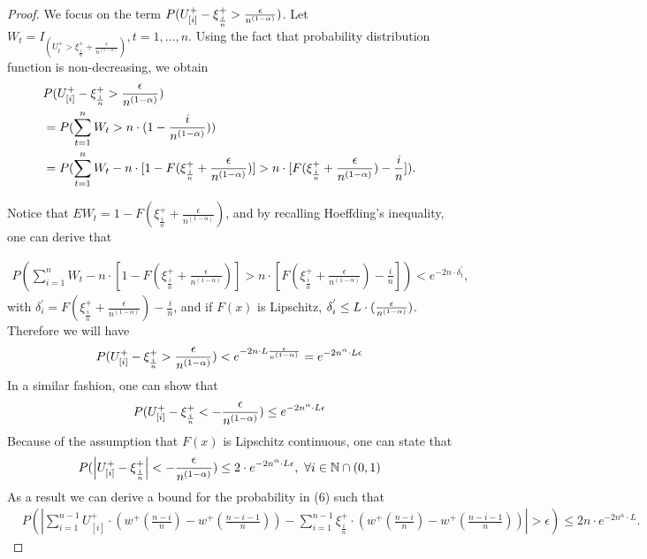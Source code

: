 \documentclass{article}
\numberwithin{equation}{section}
\numberwithin{theorem}{section}
\begin{document}
\begin{proof}
\noindent We focus on the term 
$
P ( U^+_{[i]} - \xi^+_{\frac{i}{n}} > \frac {\epsilon}{n^{(1-\alpha)}})
$.
Let $W_t = I_{(U^+_t > \xi^+_{\frac{i}{n}} + \frac{\epsilon}{n^{(1-\alpha)}})}, t=1, \ldots,n.$ Using the fact that probability distribution function is non-decreasing, we obtain 
\begin{align*}
& P ( U^+_{[i]} - \xi^+_{\frac{i}{n}} > \frac {\epsilon}{n^{(1-\alpha)}}) \\ & = P ( \sum _{t=1}^{n} W_t >
n\cdot(1-\frac{i}{n^{(1-\alpha)}})) \\ & = P ( \sum _{t=1}^{n} W_t - n \cdot [1-F(\xi^+_{\frac{i}{n}}
+\frac{\epsilon}{n^{(1-\alpha)}})] > n \cdot [F(\xi^+_{\frac{i}{n}} +\frac{\epsilon}{n^{(1-\alpha)}})
- \frac{i}{n}]).
\end{align*}

\noindent Notice that 
$E W_t = 1-F(\xi^+_{\frac{i}{n}} +\frac{\epsilon}{n^{(1-\alpha)}})$, and by recalling Hoeffding's inequality, one can derive that

\begin{align}
P ( \sum _{i=1}^{n} W_t - n \cdot [1-F(\xi^+_{\frac{i}{n}} +\frac{\epsilon}{n^{(1-\alpha) }  } ) ] > n
\cdot [F(\xi^+_{\frac{i}{n}} +\frac{\epsilon}{n^{(1-\alpha)} } ) - \frac{i}{n}]) < e^{-2n\cdot
\delta^{'}_t},
\end{align}
with $\delta^{'}_i = F(\xi^+_{\frac{i}{n}} +\frac{\epsilon} {n^{(1-\alpha)} }) - \frac{i}{n}$, and if 
$F(x)$ is Lipschitz, $ \delta^{'}_i \leq L \cdot (\frac{\epsilon}{n^{(1-\alpha)}})$.
Therefore we will have
\begin{align}
P ( U^+_{[i]} - \xi^+_{\frac{i}{n}} > \frac {\epsilon}{n^{(1-\alpha)}}) < e^{-2n\cdot L
\frac{\epsilon}{n^{(1-\alpha)}} } = e^{-2n^\alpha \cdot L  \epsilon}
\end{align}
In a  similar fashion, one can show that 
\begin{align*}
P ( U^+_{[i]} -\xi^+_{\frac{i}{n}} < -\frac {\epsilon} {n^{(1-\alpha)}}) \leq e^{-2n^\alpha \cdot L  \epsilon}
\end{align*}
Because of the assumption that $F(x)$ is Lipschitz continuous, one can state that 
\begin{align*}
P ( \left| U^+_{[i]} -\xi^+_{\frac{i}{n}} \right| < -\frac {\epsilon} {n^{(1-\alpha)}}) \leq 2\cdot
e^{-2n^\alpha \cdot L \epsilon} , \text{   }\forall i\in \mathbb{N} \cap (0,1) 
\end{align*}
As a result we can derive a bound for the probability in (6) such that
\begin{align}
&
P ( \left| \sum_{i=1}^{n-1} U^+_{[i]} \cdot (w^+(\frac{n-i}{n} )  - w^+(\frac{n-i-1}{n} ) ) -
\sum_{i=1}^{n-1} \xi^+_{\frac{i}{n}} \cdot (w^+(\frac{n-i}{n} )  - w^+(\frac{n-i-1}{n} ) ) \right| >
\epsilon) \leq 2n\cdot e^{-2n^\alpha \cdot L}.\label{eq:holder-sample-complexity-extract}
\end{align}


\end{proof}
\end{document}
